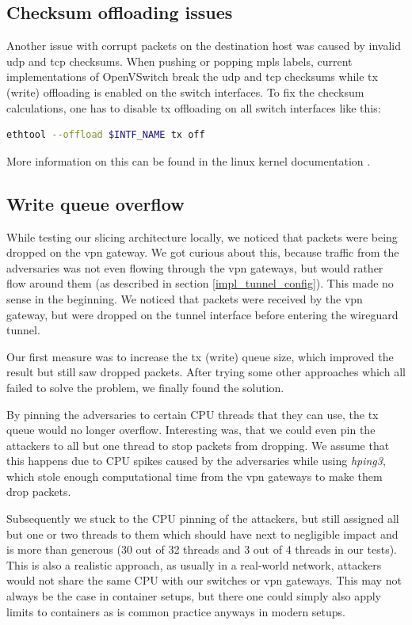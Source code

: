 \subsection{Checksum offloading issues}
Another issue with corrupt packets on the destination host was caused by invalid \acrshort{udp} and \acrshort{tcp} checksums. When pushing or popping \acrshort{mpls} labels, current implementations of OpenVSwitch break the \acrshort{udp} and \acrshort{tcp} checksums while \acrshort{tx} (write) offloading is enabled on the switch interfaces. To fix the checksum calculations, one has to disable \acrshort{tx} offloading on all switch interfaces like this:

\begin{lstlisting}[language=bash]
ethtool --offload $INTF_NAME tx off
\end{lstlisting}

More information on this can be found in the linux kernel documentation \cite{txoffload}.

\subsection{Write queue overflow}
While testing our slicing architecture locally, we noticed that packets were being dropped on the \acrshort{vpn} gateway. We got curious about this, because traffic from the adversaries was not even flowing through the \acrshort{vpn} gateways, but would rather flow around them (as described in section \ref{impl_tunnel_config}). This made no sense in the beginning. We noticed that packets were received by the \acrshort{vpn} gateway, but were dropped on the tunnel interface before entering the wireguard tunnel.

Our first measure was to increase the \acrshort{tx} (write) queue size, which improved the result but still saw dropped packets. After trying some other approaches which all failed to solve the problem, we finally found the solution.

By pinning the adversaries to certain CPU threads that they can use, the \acrshort{tx} queue would no longer overflow. Interesting was, that we could even pin the attackers to all but one thread to stop packets from dropping. We assume that this happens due to CPU spikes caused by the adversaries while using \textit{hping3}, which stole enough computational time from the \acrshort{vpn} gateways to make them drop packets.

Subsequently we stuck to the CPU pinning of the attackers, but still assigned all but one or two threads to them which should have next to negligible impact and is more than generous (30 out of 32 threads and 3 out of 4 threads in our tests). This is also a realistic approach, as usually in a real-world network, attackers would not share the same CPU with our switches or \acrshort{vpn} gateways. This may not always be the case in container setups, but there one could simply also apply limits to containers as is common practice anyways in modern setups.
